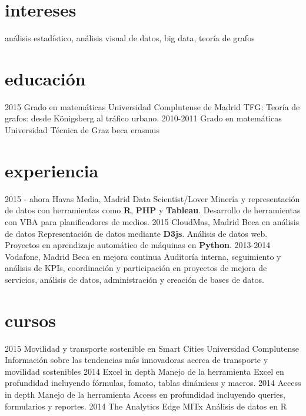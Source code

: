 \documentclass[]{friggeri-cv}
\begin{document}
\section{intereses}

análisis estadístico, análisis visual de datos, big data, teoría de grafos

\section{educación}

\begin{entrylist}
  \entry
    {2015}
    {Grado en matemáticas}
    {Universidad Complutense de Madrid}
    {TFG: Teoría de grafos: desde Königsberg al tráfico urbano.}
  \entry
    {2010-2011}
    {Grado en matemáticas}
    {Universidad Técnica de Graz}
    {beca erasmus}
\end{entrylist}

\section{experiencia}

\begin{entrylist}
  \entry
    {2015 - ahora}
    {Havas Media, Madrid}
    {Data Scientist/Lover}
    {Minería y representación de datos con herramientas como \textbf{R}, \textbf{PHP} y \textbf{Tableau}. Desarrollo de herramientas con VBA para planificadores de medios.}
  \entry
    {2015}
    {CloudMas, Madrid}
    {Beca en análisis de datos}
    {Representación de datos mediante \textbf{D3js}. Análisis de datos web. Proyectos en aprendizaje automático de máquinas en \textbf{Python}.}
  \entry
    {2013-2014}
    {Vodafone, Madrid}
    {Beca en mejora continua}
    {Auditoría interna, seguimiento y análisis de KPIs, coordinación y participación en proyectos de mejora de servicios, análisis de datos, administración y creación de bases de datos.}
\end{entrylist}

\section{cursos}

\begin{entrylist}
  \entry
    {2015}
    {Movilidad y transporte sostenible en Smart Cities}
    {Universidad Complutense}
    {Información sobre las tendencias más innovadoras acerca de transporte y movilidad sostenibles}
  \entry
    {2014}
    {Excel in depth}
    {}
    {Manejo de la herramienta Excel en profundidad incluyendo fórmulas, fomato, tablas dinámicas y macros.}
  \entry
    {2014}
    {Access in depth}
    {}
    {Manejo de la herramienta Access en profundidad incluyendo queries, formularios y reportes.}
  \entry
    {2014}
    {The Analytics Edge}
    {MITx}
    {Análisis de datos en R}
\end{entrylist}
\end{document}
